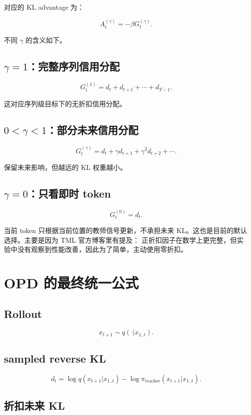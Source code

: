 \documentclass[11pt,a4paper,fontset=fandol]{ctexart}
\begin{document}
对应的 KL advantage 为：

\[
A_t^{(\gamma)}
=
-\beta G_t^{(\gamma)}.
\]

不同 \(\gamma\) 的含义如下。

\subsection{\texorpdfstring{\(\gamma=1\)}{gamma=1}：完整序列信用分配}

\[
G_t^{(1)}
=
d_t+d_{t+1}+\cdots+d_{T-1}.
\]

这对应序列级目标下的无折扣信用分配。

\subsection{\texorpdfstring{\(0<\gamma<1\)}{0<gamma<1}：部分未来信用分配}

\[
G_t^{(\gamma)}
=
d_t+\gamma d_{t+1}+\gamma^2d_{t+2}+\cdots.
\]

保留未来影响，但越远的 KL 权重越小。

\subsection{\texorpdfstring{\(\gamma=0\)}{gamma=0}：只看即时 token}

\[
\boxed{
G_t^{(0)}=d_t.
}
\]

当前 token 只根据当前位置的教师信号更新，不承担未来 KL。这也是目前的默认选择。主要是因为 TML 官方博客里有提及： 正折扣因子在数学上更完整，但实验中没有观察到性能改善，因此为了简单，主动使用零折扣。

\section{OPD 的最终统一公式}

\subsection{Rollout}

\[
x_{t+1}
\sim
q(\cdot|x_{1..t}).
\]

\subsection{sampled reverse KL}

\[
d_t
=
\log q(x_{t+1}|x_{1..t})
-
\log\pi_{\text{teacher}}(x_{t+1}|x_{1..t}).
\]

\subsection{折扣未来 KL}
\end{document}
